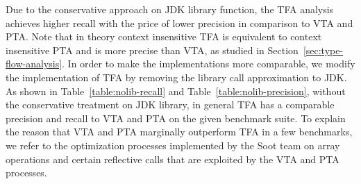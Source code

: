 \documentclass{fac}
\begin{document}
Due to the conservative approach on JDK library function, the TFA analysis achieves higher recall with the price of lower precision in comparison to VTA and PTA. Note that in theory context insensitive TFA is equivalent to context insensitive PTA and is more precise than VTA, as studied in Section~\ref{sec:type-flow-analysis}. In order to make the implementations more comparable, we modify the implementation of TFA by removing the library call approximation to JDK. As shown in Table~\ref{table:nolib-recall} and Table~\ref{table:nolib-precision}, without the conservative treatment on JDK library, in general TFA has a comparable precision and recall to VTA and PTA on the given benchmark suite. To explain the reason that VTA and PTA marginally outperform TFA in a few benchmarks, we refer to the optimization processes implemented by the Soot team on array operations and certain reflective calls that are exploited by the VTA and PTA processes.

\end{document}
